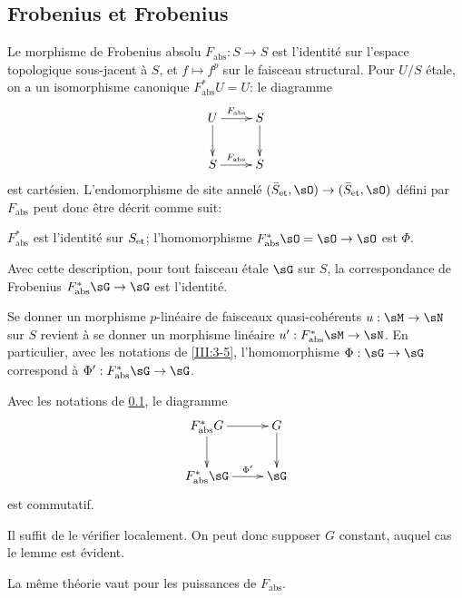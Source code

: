 \subsection{Frobenius et Frobenius}\label{III:3-4}

Le morphisme de Frobenius absolu $F_\text{abs}:S\to S$ est l'identité sur 
l'espace topologique sous-jacent à $S$, et $f\mapsto f^p$ sur le faisceau 
structural. Pour $U/S$ étale, on a un isomorphisme canonique 
$F_\text{abs}^* U=U$: le diagramme 
\[\xymatrix{
  U \ar[r]^-{F_\text{abs}} \ar[d] 
    & S \ar[d] \\
  S \ar[r]^-{F_\text{abs}} 
    & S
}\]
est cartésien. L'endomorphisme de site annelé 
$(\et{\bar S},\sO)\to(\et{\bar S},\sO)$ défini par $F_\text{abs}$ peut donc 
être décrit comme suit:
\begin{center}
  $F_\text{abs}^*$ est l'identité sur ${S}_{\textnormal{et}}$; l'homomorphisme 
  $F_\text{abs}^*\sO=\sO\to\sO$ est $\Phi$.
\end{center}
Avec cette description, pour tout faisceau étale $\sG$ sur $S$, la 
correspondance de Frobenius $F_\text{abs}^*\sG\to\sG$ est l'identité. 

Se donner un morphisme $p$-linéaire de faisceaux quasi-cohérents 
$u:\sM\to\sN$ sur $S$ revient à se donner un morphisme linéaire 
$u':F_\text{abs}^*\sM\to\sN$. En particulier, avec les notations de 
\ref{III:3-5}, l'homomorphisme $\Phi:\sG\to\sG$ correspond à 
$\Phi':F_\text{abs}^*\sG\to\sG$. 





\begin{lemma_}\label{III:3-5}
Avec les notations de \ref{III:3-4}, le diagramme 
\[\xymatrix{
  F_\textnormal{abs}^* G \ar[r] \ar[d] 
    & G \ar[d] \\
  F_\textnormal{abs}^*\sG \ar[r]^-{\Phi'} 
    & \sG 
}\]
est commutatif.
\end{lemma_}

Il suffit de le vérifier localement. On peut donc supposer $G$ constant, 
auquel cas le lemme est évident. 

La même théorie vaut pour les puissances de $F_\text{abs}$.





\subsection{}\label{III:3-6}

